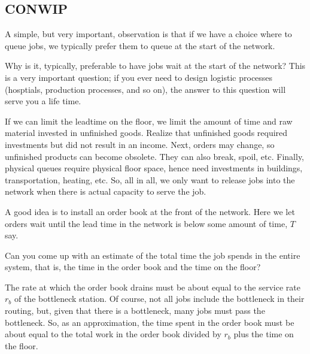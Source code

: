 \documentclass{scrartcl}
\begin{document}
\subsection{CONWIP}
\label{sec:conwip}

A simple, but very important, observation is that if we have a choice where to queue jobs, we typically prefer them to queue at the start of the network.

\begin{exercise}
  Why is it, typically, preferable to have jobs wait at the start of the network? This is a very important question; if you ever need to design logistic processes (hosptials, production processes, and so on), the answer to this question will serve you a life time. 
  \begin{solution}
    If we can limit the leadtime on the floor, we limit the amount of time and raw material invested in unfinished goods. Realize that unfinished goods required investments but did not result in an income. Next, orders may change, so unfinished products can become obsolete. They can also break, spoil, etc. Finally, physical queues require physical floor space, hence need investments in buildings, transportation, heating, etc. So, all in all, we only want to release jobs into the network when there is actual capacity to serve the job.



  \end{solution}
\end{exercise}

A good idea is to  install an order book at the front of the network. Here we let orders wait until the lead time in the network is below some amount of time, $T$ say. 
  

\begin{exercise}
  Can you come up with an estimate of the total time the job spends in the entire system, that is, the time in the order book and the time on the floor?
  \begin{solution}
The rate at which the order book drains must be about equal to the service rate $r_b$ of the bottleneck station. Of course, not all jobs include the bottleneck in their routing, but, given that there is a bottleneck, many jobs must pass the bottleneck. So, as an approximation, the time spent in the order book must be about equal to the total work in the order book divided by $r_b$ plus the time on the floor.      
  \end{solution}
\end{exercise}
\end{document}
